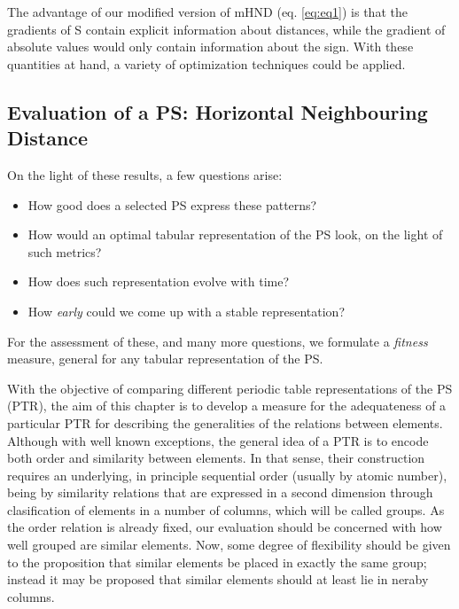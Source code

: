 \documentclass[article]{article}
\begin{document}
The advantage of our modified version of mHND (eq. \ref{eq:eq1}) is that the gradients of S contain explicit information about distances, while the gradient of absolute values would only contain information about the sign. With these quantities at hand, a variety of optimization techniques could be applied. \\


\subsection{Evaluation of a PS: Horizontal Neighbouring Distance}


On the light of these results, a few questions arise:
\begin{itemize}
	\item How good does a selected PS express these patterns? 
	\item How would an optimal tabular representation of the PS look, on the light of such metrics?
	\item How does such representation evolve with time?
	\item How \textit{early} could we come up with a stable representation?
\end{itemize}



For the assessment of these, and many more questions, we formulate a \textit{fitness} measure, general for any tabular representation of the PS.



With the objective of comparing different periodic table representations of the PS (PTR), the aim of this chapter is to develop a measure for the adequateness of a particular PTR for describing the generalities of the relations between elements. \\

Although with well known exceptions, the general idea of a PTR is to encode both order and similarity between elements. In that sense, their construction requires an underlying, in principle sequential order (usually by atomic number), being  by similarity relations that are expressed in a second dimension through clasification of elements in a number of columns, which will be called groups. As the order relation is already fixed, our evaluation should be concerned with how well grouped are similar elements. Now, some degree of flexibility should be given to the proposition that similar elements be placed in exactly the same group; instead it may be proposed that similar elements should at least lie in neraby columns.\\
\end{document}
